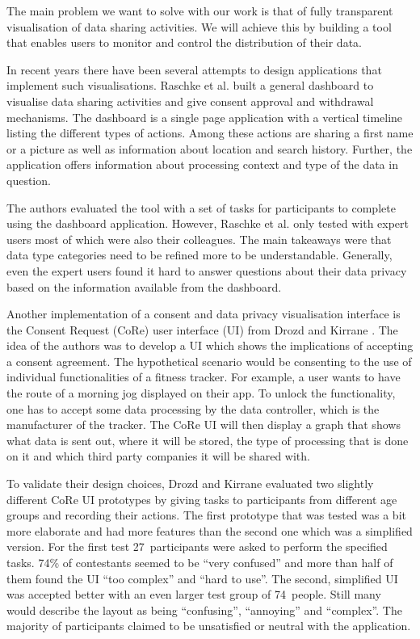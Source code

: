 \documentclass[../paper.tex]{subfiles}
\begin{document}
  The main problem we want to solve with our work is that of fully transparent
  visualisation of data sharing activities. We will achieve this by building a
  tool that enables users to monitor and control the distribution of their
  data.

  In recent years there have been several attempts to design applications that
  implement such visualisations. Raschke et al.
  \cite{core_privacy_dashboard_2018} built a general dashboard to visualise
  data sharing activities and give consent approval and withdrawal mechanisms.
  The dashboard is a single page application with a vertical timeline listing
  the different types of actions. Among these actions are sharing a first name
  or a picture as well as information about location and search history.
  Further, the application offers information about processing context and type
  of the data in question.

  The authors evaluated the tool with a set of tasks for participants to
  complete using the dashboard application. However, Raschke et al.
  \cite{core_privacy_dashboard_2018} only tested with expert users most of which 
  were also their colleagues. The main takeaways were that data type categories
  need to be refined more to be understandable. Generally, even the expert users
  found it hard to answer questions about their data privacy based on the
  information available from the dashboard.

  Another implementation of a consent and data privacy visualisation interface
  is the Consent Request (CoRe) user interface (UI) from Drozd and Kirrane
  \cite{cure2020}.  The idea of the authors was to develop a
  UI which shows the implications of accepting a consent agreement. The
  hypothetical scenario would be consenting to the use of individual
  functionalities of a fitness tracker. For example, a user wants to have the
  route of a morning jog displayed on their app. To unlock the functionality, one
  has to accept some data processing by the data controller, which is the
  manufacturer of the tracker. The CoRe UI \cite{cure2020} will then display a
  graph that shows what data is sent out, where it will be stored, the type of
  processing that is done on it and which third party companies it will be
  shared with.

  To validate their design choices, Drozd and Kirrane evaluated
  two slightly different CoRe UI prototypes by giving tasks to participants
  from different age groups and recording their actions. The first prototype
  that was tested was a bit more elaborate and had more features than the
  second one which was a simplified version. For the first test 27~participants
  were asked to perform the specified tasks. 74\% of contestants
  seemed to be “very confused” and more than half of them found the UI “too
  complex” and “hard to use”. The second, simplified UI was accepted better with
  an even larger test group of 74~people. Still many would describe the layout 
  as being “confusing”, “annoying” and “complex”. The majority of participants
  claimed to be unsatisfied or neutral with the application.
  
\end{document}
